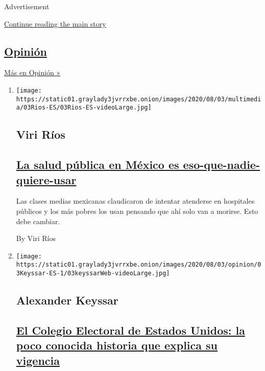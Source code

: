 Advertisement

\protect\hyperlink{after-mid1}{Continue reading the main story}

\hypertarget{opiniuxf3n}{%
\subsection{\texorpdfstring{\href{/es/section/opinion}{Opinión}}{Opinión}}\label{opiniuxf3n}}

\href{/es/section/opinion}{Más en Opinión »}

\begin{enumerate}
\def\labelenumi{\arabic{enumi}.}
\item
  \texttt{[image: https://static01.graylady3jvrrxbe.onion/images/2020/08/03/multimedia/03Rios-ES/03Rios-ES-videoLarge.jpg]}

  \hypertarget{viri-ruxedos}{%
  \subsection{Viri Ríos}\label{viri-ruxedos}}

  \hypertarget{la-salud-puxfablica-en-muxe9xico-es-eso-que-nadie-quiere-usar}{%
  \subsection{\texorpdfstring{\href{/es/2020/08/03/espanol/opinion/servicio-salud-mexico.html}{La
  salud pública en México es
  eso-que-nadie-quiere-usar}}{La salud pública en México es eso-que-nadie-quiere-usar}}\label{la-salud-puxfablica-en-muxe9xico-es-eso-que-nadie-quiere-usar}}

  Las clases medias mexicanas claudicaron de intentar atenderse en
  hospitales públicos y los más pobres los usan pensando que ahí solo
  van a morirse. Esto debe cambiar.

  By Viri Ríos
\item
  \texttt{[image: https://static01.graylady3jvrrxbe.onion/images/2020/08/03/opinion/03Keyssar-ES-1/03keyssarWeb-videoLarge.jpg]}

  \hypertarget{alexander-keyssar}{%
  \subsection{Alexander Keyssar}\label{alexander-keyssar}}

  \hypertarget{el-colegio-electoral-de-estados-unidos-la-poco-conocida-historia-que-explica-su-vigencia}{%
  \subsection{\texorpdfstring{\href{/es/2020/08/03/espanol/opinion/colegio-electoral-estados-unidos.html}{El
  Colegio Electoral de Estados Unidos: la poco conocida historia que
  explica su
  vigencia}}{El Colegio Electoral de Estados Unidos: la poco conocida historia que explica su vigencia}}\label{el-colegio-electoral-de-estados-unidos-la-poco-conocida-historia-que-explica-su-vigencia}}


\end{enumerate}
